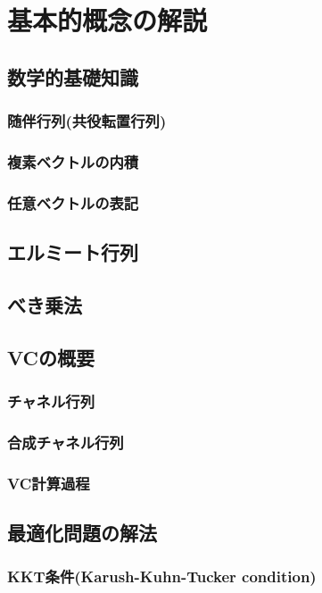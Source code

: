 \chapter{基本的概念の解説}

\section{数学的基礎知識}
\subsection{随伴行列(共役転置行列)}
\subsection{複素ベクトルの内積}
\subsection{任意ベクトルの表記}

\section{エルミート行列}

\section{べき乗法}

\section{VCの概要}
\subsection{チャネル行列}
\subsection{合成チャネル行列}
\subsection{VC計算過程}

\section{最適化問題の解法}
\subsection{KKT条件(Karush-Kuhn-Tucker condition)}
